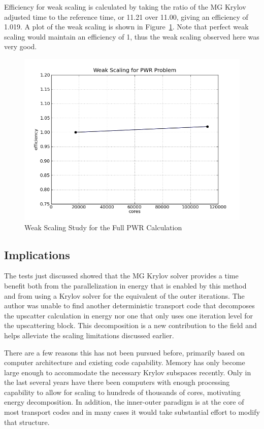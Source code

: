 Efficiency for weak scaling is calculated by taking the ratio of the MG Krylov adjusted time to the reference time, or 11.21 over 11.00, giving an efficiency of 1.019. A plot of the weak scaling is shown in Figure~\ref{fig:PWRweakScaling}. Note that perfect weak scaling would maintain an efficiency of 1, thus the weak scaling observed here was very good. 
%
\begin{figure}[!h]
  \begin{center}
    \includegraphics [width=.8\textwidth, height=0.48\textheight ] {PWRmyWeakScaling}
  \end{center}
  \caption{Weak Scaling Study for the Full PWR Calculation}
  \label{fig:PWRweakScaling}
\end{figure}

\subsection{Implications}
The tests just discussed showed that the MG Krylov solver provides a time benefit both from the parallelization in energy that is enabled by this method and from using a Krylov solver for the equivalent of the outer iterations. The author was unable to find another deterministic transport code that decomposes the upscatter calculation in energy nor one that only uses one iteration level for the upscattering block. This decomposition is a new contribution to the field and helps alleviate the scaling limitations discussed earlier.   

There are a few reasons this has not been pursued before, primarily based on computer architecture and existing code capability. Memory has only become large enough to accommodate the necessary Krylov subspaces recently. Only in the last several years have there been computers with enough processing capability to allow for scaling to hundreds of thousands of cores, motivating energy decomposition. In addition, the inner-outer paradigm is at the core of most transport codes and in many cases it would take substantial effort to modify that structure. 

